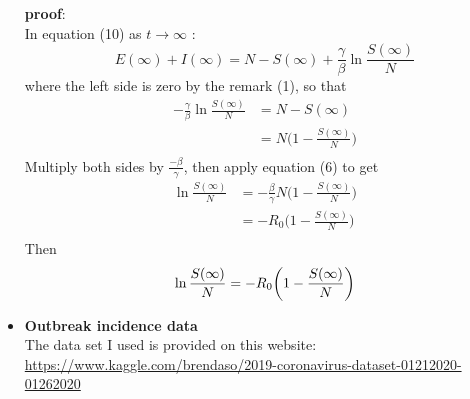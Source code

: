 \documentclass{exam}
\begin{document}
\begin{itemize}
 \textbf{proof}:\\
 In equation (10) as $t \rightarrow \infty$ :
 \begin{equation*}
 E(\infty) + I(\infty) = N -  S(\infty) + \frac{\gamma}{\beta}\ln \frac{S(\infty)}{N}
 \end{equation*}
 where the left side is zero by the remark (1), so that\\
 \begin{align*}
 -\frac{\gamma}{\beta}\ln \frac{S(\infty)}{N} &= N-S(\infty)\\
 &=N\bigg(1-\frac{S(\infty)}{N}\bigg)\\ 
 \end{align*}
 Multiply both sides by $\frac{-\beta}{\gamma}$, then apply equation (6) to get 
 \begin{align*}
 \ln \frac{S(\infty)}{N} &=-\frac{\beta}{\gamma} N\bigg(1-\frac{S(\infty)}{N}\bigg)\\
 &=-R_0\bigg(1-\frac{S(\infty)}{N}\bigg)\\
 \end{align*}
 Then \\
 \begin{equation}
 \ln \frac{S(\infty)}{N}=-R_0\bigg(1-\frac{S(\infty)}{N}\bigg)\\
 \end{equation}
 \newpage
 \item\textbf{Outbreak incidence data}\\
 
 The data set I used is provided on this website: \\
  \url{https://www.kaggle.com/brendaso/2019-coronavirus-dataset-01212020-01262020}\\
  

\end{itemize}
\end{document}
